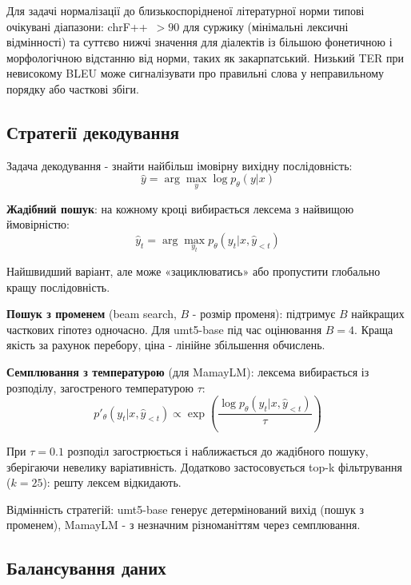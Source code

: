 \documentclass[14pt]{extarticle}
\begin{document}
Для задачі нормалізації до близькоспорідненої літературної норми типові очікувані діапазони: chrF++~$> 90$ для суржику (мінімальні лексичні відмінності) та суттєво нижчі значення для діалектів із більшою фонетичною і морфологічною відстанню від норми, таких як закарпатський. Низький TER при невисокому BLEU може сигналізувати про правильні слова у неправильному порядку або часткові збіги.

\subsection{Стратегії декодування}

Задача декодування - знайти найбільш імовірну вихідну послідовність:
\begin{equation}
  \hat{y} = \arg\max_y \log p_\theta(y|x)
  \label{eq:decoding}
\end{equation}

\textbf{Жадібний пошук}: на кожному кроці вибирається лексема з найвищою ймовірністю:
\begin{equation}
  \hat{y}_t = \arg\max_{y_t} p_\theta(y_t|x, \hat{y}_{<t})
  \label{eq:greedy}
\end{equation}

Найшвидший варіант, але може «зациклюватись» або пропустити глобально кращу послідовність.

\textbf{Пошук з променем} (beam search, $B$ - розмір променя): підтримує $B$ найкращих часткових гіпотез одночасно. Для umt5-base під час оцінювання $B = 4$. Краща якість за рахунок перебору, ціна - лінійне збільшення обчислень.

\textbf{Семплювання з температурою} (для MamayLM): лексема вибирається із розподілу, загостреного температурою $\tau$:
\begin{equation}
  p'_\theta(y_t|x, \hat{y}_{<t}) \propto \exp\!\left(\frac{\log p_\theta(y_t|x, \hat{y}_{<t})}{\tau}\right)
  \label{eq:temperature}
\end{equation}

При $\tau = 0.1$ розподіл загострюється і наближається до жадібного пошуку, зберігаючи невелику варіативність. Додатково застосовується top-k фільтрування ($k = 25$): решту лексем відкидають.

Відмінність стратегій: umt5-base генерує детермінований вихід (пошук з променем), MamayLM - з незначним різноманіттям через семплювання.

\subsection{Балансування даних}
\end{document}
